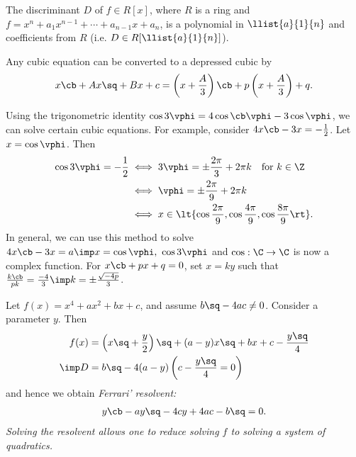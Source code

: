 \documentclass[a4paper]{article}
\begin{document}
\begin{tcorollary}
  The discriminant \( D \) of \( f\in R[x] \), where \( R \) is a ring and \( f= x^n+a_1x^{n-1}+\cdots + a_{n-1}x+a_n\), is a polynomial in \( \llist{a}{1}{n} \) and coefficients from \( R \) (i.e. \( D \in R[\llist{a}{1}{n}] \)).
\end{tcorollary}

 \quad
Any cubic equation can be converted to a depressed cubic by \begin{align*}
  x\cb+Ax\sq+Bx+c = \left(x+\frac{A}{3}\right)\cb + p\left(x+\frac{A}{3}\right) + q.
\end{align*}

\begin{ttheorem}
Using the trigonometric identity \( \cos 3\vphi = 4\cos\cb \vphi-3\cos\vphi \), we can solve certain cubic equations.
For example, consider \( 4x\cb-3x=-\frac{1}{2} \).
Let \( x=\cos \vphi \).
Then \begin{align*}
  \cos 3\vphi = -\frac{1}{2} &\iff 3\vphi = \pm \frac{2\pi}{3}+2\pi k \quad \text{for } k\in \Z \\
  &\iff \vphi = \pm\frac{2\pi}{9}+2\pi k \\
  &\iff x \in \lt\{ \cos\frac{2\pi}{9},\cos\frac{4\pi}{9},\cos\frac{8\pi}{9} \rt\}.
\end{align*}
In general, we can use this method to solve \( 4x\cb-3x=a \imp x=\cos\vphi,\ \cos 3\vphi \) and \( \cos:\C\to\C \) is now a complex function.
For \( x\cb+px+q = 0 \), set \( x=ky \) such that \( \frac{k\cb}{pk} = \frac{-4}{3} \imp k = \pm\frac{\sqrt{-4p}}{3} \).
\end{ttheorem}

\begin{tdefinition}
  Let \( f(x) = x^4 + a x^2 + b x + c \), and assume \( b\sq-4ac\neq 0 \).
  Consider a parameter \( y \).
  Then \begin{align*}
    f(x) &= \left( x\sq + \frac{y}{2} \right)\sq + (a-y)x\sq + bx + c - \frac{y\sq}{4} \\
     \imp D &= b\sq - 4(a-y)\left( c-\frac{y\sq}{4} = 0 \right)
  \end{align*}
  and hence we obtain \it{Ferrari' resolvent}:
  \begin{align*}
    y\cb-ay\sq -4cy + 4ac - b\sq = 0.
  \end{align*}
  Solving the resolvent allows one to reduce solving \( f \) to solving a system of quadratics.
\end{tdefinition}
\end{document}

